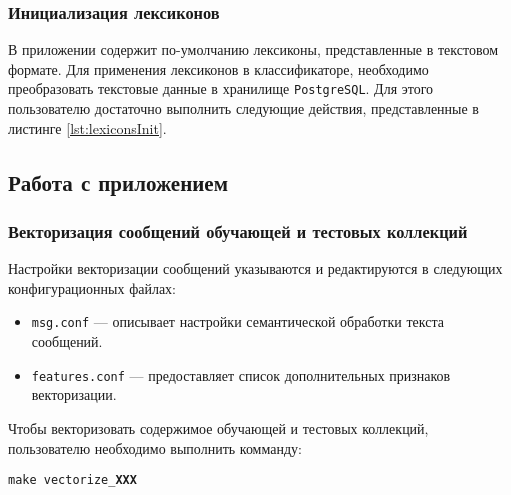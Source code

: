         \subsubsection{Инициализация лексиконов}
        В приложении содержит по-умолчанию лексиконы, представленные в текстовом
        формате. Для применения лексиконов в классификаторе, необходимо преобразовать
        текстовые данные в хранилище {\tt PostgreSQL}. Для этого пользователю
        достаточно выполнить следующие действия, представленные в листинге \ref{lst:lexiconsInit}.
        \lstset{style=bash}
        

    \subsection{Работа с приложением}
        \subsubsection{Векторизация сообщений обучающей и тестовых коллекций}
        \label{sec:usage_vectorize}
        Настройки векторизации сообщений указываются и редактируются в следующих
        конфигурационных файлах:
        \begin{itemize}
            \item {\tt msg.conf} --- описывает настройки семантической обработки текста
            сообщений. %
            \item {\tt features.conf} --- предоставляет список дополнительных признаков векторизации. %
        \end{itemize}

        Чтобы векторизовать содержимое обучающей и тестовых коллекций, пользователю
        необходимо выполнить комманду:
        \begin{center}
            {\tt make vectorize\_{\bf XXX}}
        \end{center}

